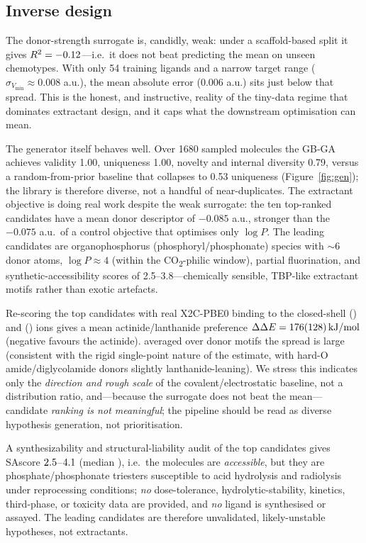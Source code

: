 \documentclass[journal=jcisd8,manuscript=article]{achemso}
\begin{document}
\subsection{Inverse design}
The donor-strength surrogate is, candidly, weak: under a scaffold-based split it
gives \(R^2=\surrR\)---i.e.\ it does not beat predicting the mean on unseen
chemotypes. With only 54 training ligands and a narrow target range
(\(\sigma_{V_{\min}}\approx 0.008\) a.u.), the mean absolute error (0.006 a.u.)
sits just below that spread. This is the honest, and instructive, reality of the
tiny-data regime that dominates extractant design, and it caps what the downstream
optimisation can mean.

The generator itself behaves well. Over 1680 sampled molecules the GB-GA achieves
validity 1.00, uniqueness 1.00, novelty \genNovelty{} and internal diversity 0.79,
versus a random-from-prior baseline that collapses to 0.53 uniqueness
(Figure~\ref{fig:gen}); the library is therefore diverse, not a handful of
near-duplicates. The extractant objective is doing real work despite the weak
surrogate: the ten top-ranked candidates have a mean donor descriptor of
\(-0.085\) a.u., stronger than the \(-0.075\) a.u.\ of a control objective that
optimises only \(\log P\). The leading candidates are organophosphorus
(phosphoryl/phosphonate) species with \(\sim\!6\) donor atoms, \(\log P\approx 4\)
(within the CO\textsubscript{2}-philic window), partial fluorination, and
synthetic-accessibility scores of 2.5--3.8---chemically sensible, TBP-like
extractant motifs rather than exotic artefacts.

Re-scoring the top candidates with real X2C-PBE0 binding to the closed-shell
 () and  () ions gives a mean
actinide/lanthanide preference \(\Delta\Delta E=\ddEsel\) (negative favours the
actinide). averaged over donor motifs the spread is large (consistent with the rigid
single-point nature of the estimate, with hard-O amide/diglycolamide donors
slightly lanthanide-leaning). We stress this indicates only the \emph{direction and
rough scale} of the  covalent/electrostatic baseline, not a distribution
ratio, and---because the surrogate does not beat the mean---candidate \emph{ranking
is not meaningful}; the pipeline should be read as diverse hypothesis generation,
not prioritisation.

A synthesizability and structural-liability audit of the top candidates gives
SAscore \(\saMin\)--\(\saMax\) (median \saMed), i.e.\ the molecules are
\emph{accessible}, but they are phosphate/phosphonate triesters susceptible to acid
hydrolysis and radiolysis under reprocessing conditions; \emph{no} dose-tolerance,
hydrolytic-stability, kinetics, third-phase, or toxicity data are provided, and
\emph{no} ligand is synthesised or assayed. The leading candidates are therefore
unvalidated, likely-unstable hypotheses, not extractants.
\end{document}
